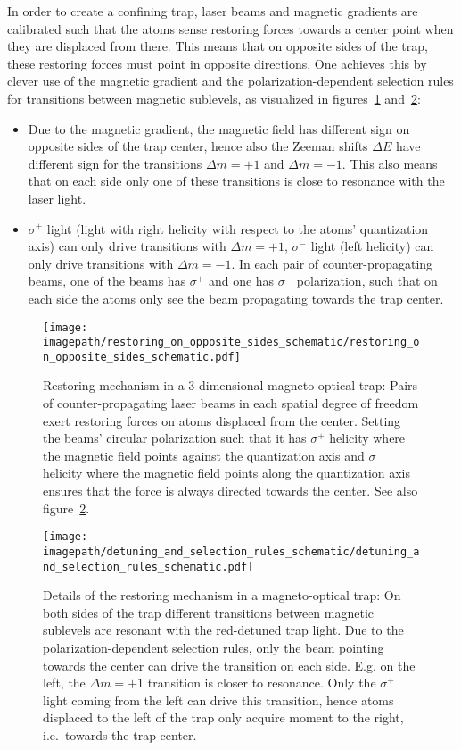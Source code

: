 In order to create a confining trap, laser beams and magnetic gradients are calibrated such that the atoms sense restoring forces towards a center point when they are displaced from there. This means that on opposite sides of the trap, these restoring forces must point in opposite directions. One achieves this by clever use of the magnetic gradient and the polarization-dependent selection rules for transitions between magnetic sublevels, as visualized in figures~\ref{fig:restoring_on_opposite_sides_schematic} and~\ref{fig:detuning_and_selection_rules_schematic}:
\begin{itemize}
    \item Due to the magnetic gradient, the magnetic field has different sign on opposite sides of the trap center, hence also the Zeeman shifts $\Delta E$ have different sign for the transitions $\Delta m = +1$ and $\Delta m = -1$. This also means that on each side only one of these transitions is close to resonance with the laser light.
    \item $\sigma^+$ light (light with right helicity with respect to the atoms' quantization axis) can only drive transitions with $\Delta m = +1$, $\sigma^-$ light (left helicity) can only drive transitions with $\Delta m = -1$. In each pair of counter-propagating beams, one of the beams has $\sigma^+$ and one has $\sigma^-$ polarization, such that on each side the atoms only see the beam propagating towards the trap center.
\end{itemize}

\begin{figure}
    \centering
    \texttt{[image: \\imagepath/restoring\_on\_opposite\_sides\_schematic/restoring\_on\_opposite\_sides\_schematic.pdf]}
    \caption{Restoring mechanism in a 3-dimensional magneto-optical trap: Pairs of counter-propagating laser beams in each spatial degree of freedom exert restoring forces on atoms displaced from the center. Setting the beams' circular polarization such that it has $\sigma^+$ helicity where the magnetic field points against the quantization axis and $\sigma^-$ helicity where the magnetic field points along the quantization axis ensures that the force is always directed towards the center. See also figure~\ref{fig:detuning_and_selection_rules_schematic}.}
    \label{fig:restoring_on_opposite_sides_schematic}
\end{figure} 

\begin{figure}
    \centering
    \texttt{[image: \\imagepath/detuning\_and\_selection\_rules\_schematic/detuning\_and\_selection\_rules\_schematic.pdf]}
    \caption{Details of the restoring mechanism in a magneto-optical trap: On both sides of the trap different transitions between magnetic sublevels are resonant with the red-detuned trap light. Due to the polarization-dependent selection rules, only the  beam pointing towards the center can drive the transition on each side. E.g. on the left, the $\Delta  m = +1$ transition is closer to resonance. Only the $\sigma^+$ light coming from the left can drive this transition, hence atoms displaced to the left of the trap only acquire moment to the right, i.e.~towards the trap center.}
    \label{fig:detuning_and_selection_rules_schematic}
\end{figure}

